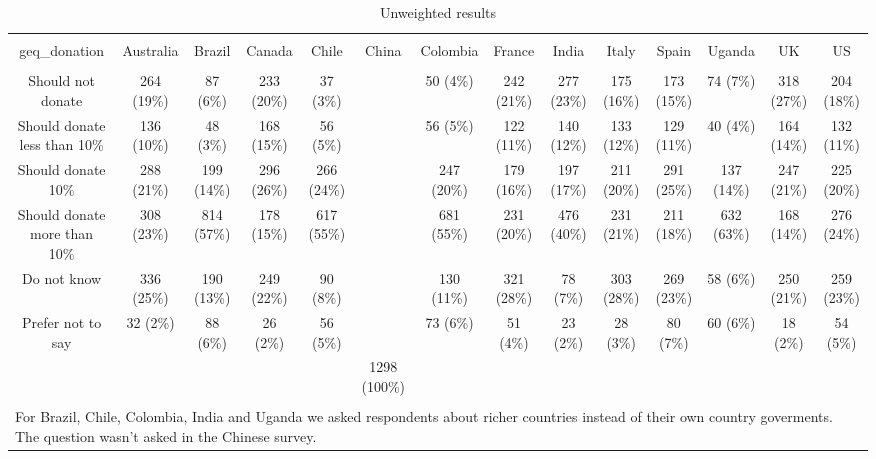 
\begin{table}[!htbp] \centering 
  \caption{Unweighted results} 
  \label{} 
\begin{tabular}{@{\extracolsep{5pt}} cccccccccccccc} 
\\[-1.8ex]\hline 
\hline \\[-1.8ex] 
geq\_donation & Australia & Brazil & Canada & Chile & China & Colombia & France & India & Italy & Spain & Uganda & UK & US \\ 
\hline \\[-1.8ex] 
Should not donate & 264 (19\%) & 87 (6\%) & 233 (20\%) & 37 (3\%) &  & 50 (4\%) & 242 (21\%) & 277 (23\%) & 175 (16\%) & 173 (15\%) & 74 (7\%) & 318 (27\%) & 204 (18\%) \\ 
Should donate less than 10\% & 136 (10\%) & 48 (3\%) & 168 (15\%) & 56 (5\%) &  & 56 (5\%) & 122 (11\%) & 140 (12\%) & 133 (12\%) & 129 (11\%) & 40 (4\%) & 164 (14\%) & 132 (11\%) \\ 
Should donate 10\% & 288 (21\%) & 199 (14\%) & 296 (26\%) & 266 (24\%) &  & 247 (20\%) & 179 (16\%) & 197 (17\%) & 211 (20\%) & 291 (25\%) & 137 (14\%) & 247 (21\%) & 225 (20\%) \\ 
Should donate more than 10\% & 308 (23\%) & 814 (57\%) & 178 (15\%) & 617 (55\%) &  & 681 (55\%) & 231 (20\%) & 476 (40\%) & 231 (21\%) & 211 (18\%) & 632 (63\%) & 168 (14\%) & 276 (24\%) \\ 
Do not know & 336 (25\%) & 190 (13\%) & 249 (22\%) & 90 (8\%) &  & 130 (11\%) & 321 (28\%) & 78 (7\%) & 303 (28\%) & 269 (23\%) & 58 (6\%) & 250 (21\%) & 259 (23\%) \\ 
Prefer not to say & 32 (2\%) & 88 (6\%) & 26 (2\%) & 56 (5\%) &  & 73 (6\%) & 51 (4\%) & 23 (2\%) & 28 (3\%) & 80 (7\%) & 60 (6\%) & 18 (2\%) & 54 (5\%) \\ 
 &  &  &  &  & 1298 (100\%) &  &  &  &  &  &  &  &  \\ 
\hline \\[-1.8ex] 
\multicolumn{14}{l}{For Brazil, Chile, Colombia, India and Uganda we asked respondents about richer countries instead of their own country goverments. The question wasn't asked in the Chinese survey.} \\ 
\end{tabular} 
\end{table} 
